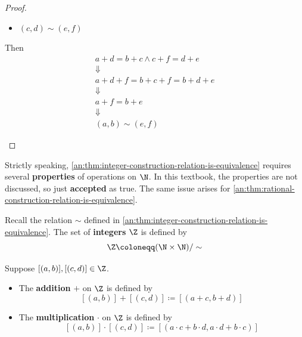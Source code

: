 \begin{proof}
\begin{itemize}
\begin{itemize}
            \item $(c, d) \sim (e, f)$
          \end{itemize}
          Then
          \[
            \begin{array}{c}
              a + d = b + c \land c + f = d + e \\
              \Downarrow                        \\
              a + d + f = b + c + f = b + d + e \\
              \Downarrow                        \\
              a + f = b + e                     \\
              \Downarrow                        \\
              (a, b) \sim (e, f)
            \end{array}
          \]
  \end{itemize}
\end{proof}

\bigskip

\begin{remark}
  Strictly speaking, \cref{an:thm:integer-construction-relation-is-equivalence} requires several
  \textbf{properties} of operations on $\N$. In this textbook, the properties are not discussed, so just
  \textbf{accepted} as true. The same issue arises for \cref{an:thm:rational-construction-relation-is-equivalence}.
\end{remark}

\bigskip

\begin{definition} \label{an:def:integer-number-system}
  Recall the relation $\sim$ defined in \cref{an:thm:integer-construction-relation-is-equivalence}.
  The set of \textbf{integers} $\Z$ is defined by
  \[
    \Z \coloneqq (\N \times \N) / \sim
  \]
\end{definition}

\bigskip

\begin{definition} \label{an:def:operations-on-Z}
  Suppose $[(a, b)], [(c, d)] \in \Z$.
  \begin{itemize}
    \item The \textbf{addition} $+$ on $\Z$ is defined by
          \[
            [(a, b)] + [(c, d)] \coloneqq [(a + c, b + d)]
          \]
    \item The \textbf{multiplication} $\cdot$ on $\Z$ is defined by
          \[
            [(a, b)] \cdot [(c, d)] \coloneqq [(a \cdot c + b \cdot d, a \cdot d + b \cdot c)]
          \]
  \end{itemize}
\end{definition}

